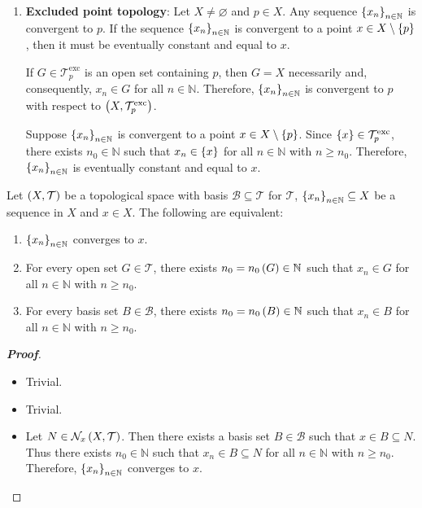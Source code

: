 \begin{example}
\begin{enumerate}
    \item \textbf{Excluded point topology}: Let $X\neq\varnothing$ and $p\in X$. Any sequence $\left\{x_n\right\}_{n\in\mathbb{N}}$ is convergent to $p$. If the sequence $\left\{x_n\right\}_{n\in\mathbb{N}}$ is convergent to a point $x\in X\setminus\left\{p\right\}$, then it must be eventually constant and equal to $x$. 
    
    If $G\in\mathcal{T}_p^{\text{exc}}$ is an open set containing $p$, then $G=X$ necessarily and, consequently, $x_n\in G$ for all $n\in\mathbb{N}$. Therefore, $\left\{x_n\right\}_{n\in\mathbb{N}}$ is convergent to $p$ with respect to $\left(X,\mathcal{T}_p^{\text{exc}}\right)$.

    Suppose $\left\{x_n\right\}_{n\in\mathbb{N}}$ is convergent to a point $x\in X\setminus\left\{p\right\}$. Since $\left\{x\right\}\in\mathcal{T}_p^{\text{exc}}$, there exists $n_0\in\mathbb{N}$ such that $x_n\in\left\{x\right\}$ for all $n\in\mathbb{N}$ with $n\geq n_0$. Therefore, $\left\{x_n\right\}_{n\in\mathbb{N}}$ is eventually constant and equal to $x$.
  \end{enumerate}
\end{example}

\begin{proposition}
  Let $\left(X,\mathcal{T}\right)$ be a topological space with basis $\mathcal{B}\subseteq\mathcal{T}$ for $\mathcal{T}$, $\left\{x_n\right\}_{n\in\mathbb{N}}\subseteq X$ be a sequence in $X$ and $x\in X$. The following are equivalent:

  \begin{enumerate}
    \item $\left\{x_n\right\}_{n\in\mathbb{N}}$ converges to $x$.
    \item For every open set $G\in\mathcal{T}$, there exists $n_0=n_0\left(G\right)\in\mathbb{N}$ such that $x_n\in G$ for all $n\in\mathbb{N}$ with $n\geq n_0$.
    \item For every basis set $B\in\mathcal{B}$, there exists $n_0=n_0\left(B\right)\in\mathbb{N}$ such that $x_n\in B$ for all $n\in\mathbb{N}$ with $n\geq n_0$.
  \end{enumerate}
  \begin{proof}[\rm\textbf{Proof}]
    \hfill
    \begin{itemize}
      \item[\boxed{1\Rightarrow2}] Trivial.
      \item[\boxed{2\Rightarrow3}] Trivial.
      \item[\boxed{3\Rightarrow1}] Let $N\in\mathcal{N}_x\left(X,\mathcal{T}\right)$. Then there exists a basis set $B\in\mathcal{B}$ such that $x\in B\subseteq N$. Thus there exists $n_0\in\mathbb{N}$ such that $x_n\in B\subseteq N$ for all $n\in\mathbb{N}$ with $n\geq n_0$. Therefore, $\left\{x_n\right\}_{n\in\mathbb{N}}$ converges to $x$.
    \end{itemize}
  \end{proof}
\end{proposition}

